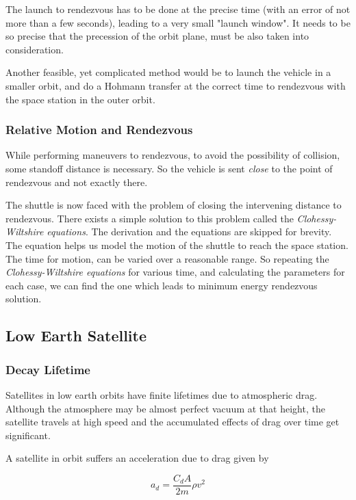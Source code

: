 \documentclass{article}
\theoremstyle{definition}
\begin{document}
The launch to rendezvous has to be done at the precise time (with an error of not more than a few seconds), leading to a very small "launch window".
It needs to be so precise that the precession of the orbit plane, must be also taken into consideration.

Another feasible, yet complicated method would be to launch the vehicle in a smaller orbit, and do a Hohmann transfer at the correct time to rendezvous with the space station in the outer orbit.

\subsubsection{Relative Motion and Rendezvous}

While performing maneuvers to rendezvous, to avoid the possibility of collision, some standoff distance is necessary.
So the vehicle is sent \emph{close} to the point of rendezvous and not exactly there.

The shuttle is now faced with the problem of closing the intervening distance to rendezvous. There exists a simple solution to this problem called the \emph{Clohessy-Wiltshire equations}. The derivation and the equations are skipped for brevity. 
The equation helps us model the motion of the shuttle to reach the space station.
The time for motion, can be varied over a reasonable range. So repeating the \emph{Clohessy-Wiltshire equations} for various time, and calculating the parameters for each case, we can find the one which leads to minimum energy rendezvous solution.

\subsection{Low Earth Satellite}
\subsubsection{Decay Lifetime}

Satellites in low earth orbits have finite lifetimes due to atmospheric drag.
Although the atmosphere may be almost perfect vacuum at that height, the satellite travels at high speed and the accumulated effects of drag over time get significant.

A satellite in orbit suffers an acceleration due to drag given by

\begin{equation}
    a_d = \frac{C_dA}{2m}\rho v^2
\end{equation}
\end{document}
